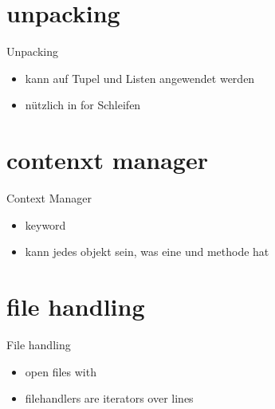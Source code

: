 \section{unpacking}
\begin{frame}{Unpacking}
\begin{itemize}
	\item kann auf Tupel und Listen angewendet werden
	\item nützlich in for Schleifen
\end{itemize}
\end{frame}
\begin{frame}{}
	
\end{frame}

\section{contenxt manager}
\begin{frame}{Context Manager}
\begin{itemize}
	\item keyword 
	\item kann jedes objekt sein, was eine  und  methode hat
\end{itemize}
\end{frame}
\begin{frame}{}
	
\end{frame}

\section{file handling}
\begin{frame}{File handling}
\begin{itemize}
	\item open files with 
	\item filehandlers are iterators over lines
\end{itemize}
\end{frame}
\begin{frame}{}
	
\end{frame}


